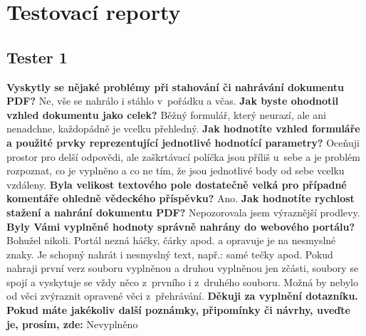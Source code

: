 \chapter{Testovací reporty}
\label{chap:testovaci_reporty}

\section{Tester 1}

\textbf{Vyskytly se nějaké problémy při stahování či nahrávání dokumentu PDF?}
\newline
Ne, vše se nahrálo i stáhlo v~pořádku a včas.
\newline
\newline
\textbf{Jak byste ohodnotil vzhled dokumentu jako celek?}
\newline
Běžný formulář, který neurazí, ale ani nenadchne, každopádně je vcelku přehledný.
\newline
\newline
\textbf{Jak hodnotíte vzhled formuláře a použité prvky reprezentující jednotlivé hodnotící parametry?}
\newline
Oceňuji prostor pro delší odpovědi, ale zaškrtávací políčka jsou příliš u~sebe a je problém rozpoznat, co je vyplněno a co ne tím, že jsou jednotlivé body od sebe vcelku vzdáleny.
\newline
\newline
\textbf{Byla velikost textového pole dostatečně velká pro případné komentáře ohledně vědeckého příspěvku?}
\newline
Ano.
\newline
\newline
\textbf{Jak hodnotíte rychlost stažení a nahrání dokumentu PDF?} 
\newline
Nepozorovala jsem výraznější prodlevy.
\newline
\newline
\textbf{Byly Vámi vyplněné hodnoty správně nahrány do webového portálu?}
\newline
Bohužel nikoli. Portál nezná háčky, čárky apod. a opravuje je na nesmyslné znaky. Je schopný nahrát i nesmyslný text, např.: samé tečky apod. Pokud nahraji první verz souboru vyplněnou a druhou vyplněnou jen zčásti, soubory se spojí a vyskytuje se vždy něco z~prvního i z~druhého souboru. Možná by nebylo od věci zvýraznit opravené věci z~přehrávání.
\newline
\newline
\textbf{Děkuji za vyplnění dotazníku. Pokud máte jakékoliv další poznámky, připomínky či návrhy, uveďte je, prosím, zde:}
\newline
Nevyplněno
\newpage 

